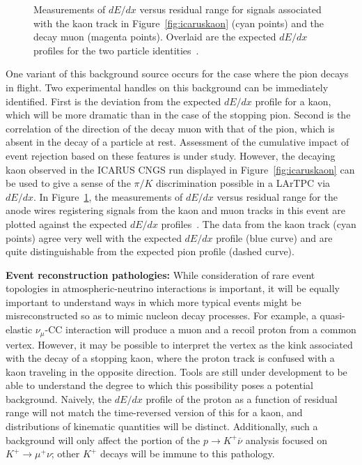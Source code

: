 %
\begin{figure}[!htb]
\centering
\centering
\caption[$dE/dx$ profile of decaying kaon in the ICARUS CNGS run]
        {Measurements of $dE/dx$ versus residual range for signals
          associated with the kaon track in Figure~\ref{fig:icaruskaon} (cyan points) and the decay muon
          (magenta points).  Overlaid are the expected $dE/dx$ profiles for the
          two particle identities~\cite{Antonello:2012hu}. }
\label{fig:pdkdedx}
\end{figure}
One variant of this background source occurs for the case where the
pion decays in flight.  Two experimental handles on this background
can be immediately identified.  First is the deviation from the
expected $dE/dx$ profile for a kaon, which will be more dramatic than
in the case of the stopping pion.  Second is the correlation of the
direction of the decay muon with that of the pion, which is absent in
the decay of a particle at rest.  Assessment of the cumulative impact
of event rejection based on these features is under study.  However,
the decaying kaon observed in the ICARUS CNGS run displayed in 
Figure~\ref{fig:icaruskaon} can be used to give a sense of the 
$\pi/K$ discrimination possible in a LArTPC via $dE/dx$.   
In Figure~\ref{fig:pdkdedx}, the measurements
of $dE/dx$ versus residual range for the anode wires registering
signals from the kaon and muon tracks in this event are plotted
against the expected $dE/dx$ profiles~\cite{Antonello:2012hu}. The
data from the kaon track (cyan points) agree very well with the
expected $dE/dx$ profile (blue curve) and are quite distinguishable
from the expected pion profile (dashed curve).

\textbf{\boldmath Event reconstruction pathologies:}
While consideration of rare event topologies in atmospheric-neutrino 
interactions is important, it will be equally important to understand 
ways in which more typical events might be misreconstructed so as 
to mimic nucleon decay processes.  For example, a quasi-elastic 
$\nu_\mu$-CC interaction will produce a muon and a recoil
proton from a common vertex.  However, it may be possible to interpret 
the vertex as the kink associated with the decay of a stopping kaon, 
where the proton track is confused with a kaon traveling in the opposite 
direction.  Tools are still under development to be able to understand 
the degree to which this possibility poses a potential background.  
Naively, the $dE/dx$ profile of the proton as a function of residual range 
will not match the time-reversed version of this for a kaon, 
and distributions of kinematic quantities will be 
distinct.  Additionally, such a background will only affect 
the portion of the $p\to K^+\overline{\nu}$ analysis focused 
on $K^+\to \mu^+\nu$; other $K^+$ decays will be immune to this 
pathology.  

